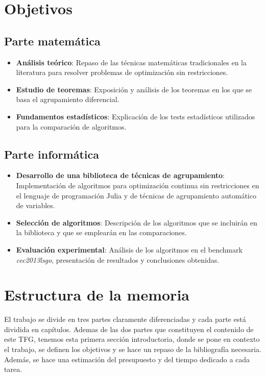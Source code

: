 \section{Objetivos}

\subsection*{Parte matemática}
\begin{itemize}
    \item \textbf{Análisis teórico}: Repaso de las técnicas matemáticas tradicionales en la literatura para resolver problemas de optimización sin restricciones.
    \item \textbf{Estudio de teoremas}: Exposición y análisis de los teoremas en los que se basa el agrupamiento diferencial.
    \item \textbf{Fundamentos estadísticos}: Explicación de los tests estadísticos utilizados para la comparación de algoritmos.
\end{itemize}

\subsection*{Parte informática}
\begin{itemize}
    \item \textbf{Desarrollo de una biblioteca de técnicas de agrupamiento}: Implementación de algoritmos para optimización continua sin restricciones en el lenguaje de programación Julia y de técnicas de agrupamiento automático de variables.
    \item \textbf{Selección de algoritmos}: Descripción de los algoritmos que se incluirán en la biblioteca y que se emplearán en las comparaciones.
    \item \textbf{Evaluación experimental}: Análisis de los algoritmos en el benchmark \textit{cec2013lsgo}, presentación de resultados y conclusiones obtenidas.
\end{itemize}

\section{Estructura de la memoria}

El trabajo se divide en tres partes claramente diferenciadas y cada parte está dividida en capítulos. Ademas de las dos partes que constituyen el contenido de este TFG, tenemos esta primera sección introductoria, donde se pone en contexto el trabajo, se definen los objetivos y se hace un repaso de la bibliografía necesaria. 
Además, se hace una estimación del presupuesto y del tiempo dedicado a cada tarea.

